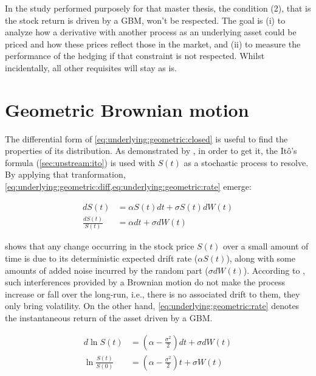 \documentclass[a4paper, 12pt]{report}
\newcommand{\dBm}{dW\left(t\right)}
\newcommand{\Bm}{W\left(t\right)}
\newcommand{\St}{S\left(t\right)}
\newcommand{\dSt}{dS\left(t\right)}
\newcommand{\dSr}{\frac{\dSt}{\St}}
\newcommand{\Scontinousdiff}{d\St &= \alpha \St dt + \sigma \St \dBm}
\newcommand{\Scontinuousrate}{\dSr &= \alpha dt + \sigma \dBm}
\begin{document}
In the study performed purposely for that master thesis, the condition (2), that is the stock return is driven by a GBM, won't be respected. 
The goal is (i) to analyze how a derivative with another process as an underlying asset could be priced and how these prices reflect those in the market, and (ii) to measure the performance of the hedging if that constraint is not respected.
Whilst incidentally, all other requisites will stay as is.


\section{Geometric Brownian motion}
\label{sec:underlying:derivation}

The differential form of \cref{eq:underlying:geometric:closed} is useful to find the properties of its distribution.
As demonstrated by \citet{shreve}, in order to get it, the Itô's formula (\cref{sec:upstream:ito}) is used with $S(t)$ as a stochastic process to resolve. 
By applying that tranformation, \cref{eq:underlying:geometric:diff,eq:underlying:geometric:rate} emerge:
 
\begin{center}
  \begin{subequations}
    \begin{align}
      \Scontinousdiff \label{eq:underlying:geometric:diff} \\
      \Scontinuousrate \label{eq:underlying:geometric:rate}
    \end{align}
  \end{subequations}
\end{center}

 shows that any change occurring in the stock price $S(t)$ over a small amount of time is due to its deterministic expected drift rate ($\alpha \St$), along with some amounts of added noise incurred by the random part ($\sigma d\Bm$). 
According to \citet{shreve}, such interferences provided by a Brownian motion do not make the process increase or fall over the long-run, i.e., there is no associated drift to them, they only bring volatility.
On the other hand, \cref{eq:underlying:geometric:rate} denotes the instantaneous return of the asset driven by a GBM.

\begin{align}
  d\ln{\St} &= (\alpha - \frac{\sigma ^2}{2}) dt 
              + \sigma d\Bm \label{eq:underlying:logreturn:diff} \\
  \ln{\frac{\St}{S(0)}} &= (\alpha - \frac{\sigma ^2}{2}) t 
              + \sigma \Bm \label{eq:underlying:log:return}
\end{align}
\end{document}
